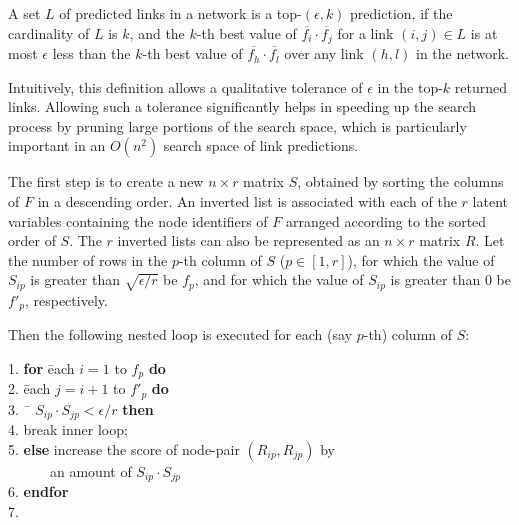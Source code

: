 \begin{definition}[top-$(\epsilon, k)$ predictions]
A set $L$ of predicted links in a network is a top-$(\epsilon, k)$ prediction, if
the cardinality of $L$ is $k$, and the $k$-th best  value of
$\overline{f_i} \cdot \overline{f_j} $ for a link $(i, j) \in L$ is
at most $\epsilon$ less than the $k$-th best value of
$\overline{f_h} \cdot \overline{f_l}$ over any link $(h , l)$ in the
network.
\end{definition}
Intuitively, this definition allows a qualitative  tolerance of
$\epsilon$ in the top-$k$ returned links. Allowing such a tolerance
significantly helps in speeding up the search process by pruning
large portions of the search space, which is particularly important
in an $O(n^2)$ search space of link predictions.

The first step is to create a new $n \times r$ matrix $S$,
obtained by sorting the columns of $F$ in a descending order. An inverted list is
associated with each of the $r$ latent variables containing the node
identifiers  of $F$ arranged according to the sorted order of $S$. The
$r$ inverted lists can also be represented as an $n \times r$ matrix
$R$. Let the number of rows in the $p$-th column of $S$ ($p\in[1, r]$), for which
the value of $S_{ip}$ is greater than $\sqrt{\epsilon/r}$ be $f_p$, and for which the value of $S_{ip}$ is greater than 0 be $f'_p$, respectively.

Then the following nested loop is executed for each (say $p$-th) column of $S$:

\begin{tabbing}1. \hspace{5ex}\=
{\bf for} \= each $i=1$ to $f_p$ {\bf do}\\
2. \> \= each $j=i+1$ to $f'_p$ {\bf do}\\
3. \>\>\ \= $S_{ip} \cdot S_{jp} < \epsilon/r$ {\bf then}\\
4. \>\>\>\>break inner loop; \\
5. \>\>\> {\bf else} increase the score of node-pair $(R_{ip}, R_{jp})$ by \\
   \>\>\> \ \ \ \ \ \ an amount of $S_{ip} \cdot S_{jp}$\\
6. \>\> {\bf endfor}\\
7. 
\end{tabbing}

